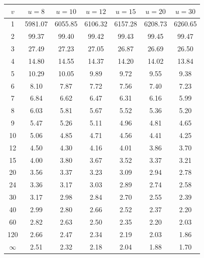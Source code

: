\begin{center}
\small
\begin{tabular}{c|cccccc}
\toprule
$v$ & $u=8$ & $u=10$ & $u=12$ & $u=15$ & $u=20$ & $u=30$ \\
\midrule
1 & 5981.07 & 6055.85 & 6106.32 & 6157.28 & 6208.73 & 6260.65 \\
2 & 99.37 & 99.40 & 99.42 & 99.43 & 99.45 & 99.47 \\
3 & 27.49 & 27.23 & 27.05 & 26.87 & 26.69 & 26.50 \\
4 & 14.80 & 14.55 & 14.37 & 14.20 & 14.02 & 13.84 \\
5 & 10.29 & 10.05 & 9.89 & 9.72 & 9.55 & 9.38 \\
6 & 8.10 & 7.87 & 7.72 & 7.56 & 7.40 & 7.23 \\
7 & 6.84 & 6.62 & 6.47 & 6.31 & 6.16 & 5.99 \\
8 & 6.03 & 5.81 & 5.67 & 5.52 & 5.36 & 5.20 \\
9 & 5.47 & 5.26 & 5.11 & 4.96 & 4.81 & 4.65 \\
10 & 5.06 & 4.85 & 4.71 & 4.56 & 4.41 & 4.25 \\
12 & 4.50 & 4.30 & 4.16 & 4.01 & 3.86 & 3.70 \\
15 & 4.00 & 3.80 & 3.67 & 3.52 & 3.37 & 3.21 \\
20 & 3.56 & 3.37 & 3.23 & 3.09 & 2.94 & 2.78 \\
24 & 3.36 & 3.17 & 3.03 & 2.89 & 2.74 & 2.58 \\
30 & 3.17 & 2.98 & 2.84 & 2.70 & 2.55 & 2.39 \\
40 & 2.99 & 2.80 & 2.66 & 2.52 & 2.37 & 2.20 \\
60 & 2.82 & 2.63 & 2.50 & 2.35 & 2.20 & 2.03 \\
120 & 2.66 & 2.47 & 2.34 & 2.19 & 2.03 & 1.86 \\
$\infty$ & 2.51 & 2.32 & 2.18 & 2.04 & 1.88 & 1.70 \\
\bottomrule
\end{tabular}
\end{center}
